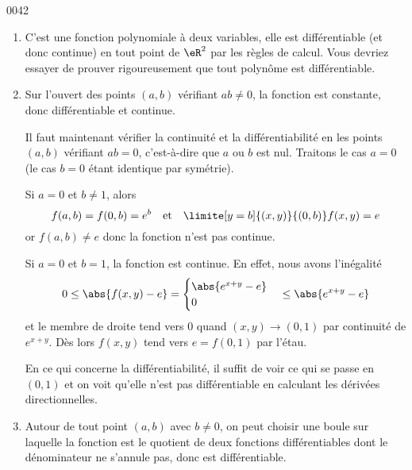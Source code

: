 
\begin{corrige}{0042}


\begin{enumerate}
\item C'est une fonction polynomiale à deux variables, elle est différentiable (et donc continue) en tout point de $\eR^2$ par les règles de calcul. Vous devriez essayer de prouver rigoureusement que tout polynôme est différentiable.

\item Sur l'ouvert des points $(a,b)$ vérifiant $ab \neq 0$, la
  fonction est constante, donc différentiable et continue.

  Il faut maintenant vérifier la continuité et la différentiabilité en
  les points $(a,b)$ vérifiant $ab = 0$, c'est-à-dire que $a$ ou $b$
  est nul. Traitons le cas $a = 0$ (le cas $b = 0$ étant identique par
  symétrie).

  Si $a = 0$ et $b \neq 1$, alors
  \begin{equation*}
    f(a,b) = f(0,b) = e^{b} \quad\text{et}\quad \limite[y =
    b]{(x,y)}{(0,b)} f(x,y) = e
  \end{equation*}
  or $f(a,b) \neq e$ donc la fonction n'est pas continue.

  Si $a = 0$ et $b = 1$, la fonction est continue. En effet, nous
  avons l'inégalité
  \begin{equation*}
    0 \leq \abs{f(x,y) - e} =
    \begin{cases}
      \abs{e^{x+y}-e}\\
      0
    \end{cases} \leq \abs{e^{x+y} - e}
  \end{equation*}
  et le membre de droite tend vers $0$ quand $(x,y) \rightarrow (0,1)$
  par continuité de $e^{x+y}$. Dès lors $f(x,y)$ tend vers $e =
  f(0,1)$ par l'étau.

  En ce qui concerne la différentiabilité, il suffit de voir ce qui se
  passe en $(0,1)$ et on voit qu'elle n'est pas différentiable en
  calculant les dérivées directionnelles.

\item Autour de tout point $(a,b)$ avec $b \neq 0$, on peut choisir
  une boule sur laquelle la fonction est le quotient de deux fonctions
  différentiables dont le dénominateur ne s'annule pas, donc est
  différentiable.


\end{enumerate}
\end{corrige}
